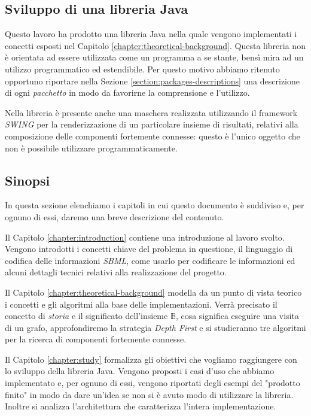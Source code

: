 \subsection{Sviluppo di una libreria Java}
Questo lavoro ha prodotto una libreria Java nella quale vengono
implementati i concetti esposti nel Capitolo
\ref{chapter:theoretical-background}. Questa libreria non \`e
orientata ad essere utilizzata come un programma a se stante, bens\`i
mira ad un utilizzo programmatico ed estendibile. Per questo motivo
abbiamo ritenuto opportuno riportare nella Sezione
\ref{section:packages-descriptions} una descrizione di ogni
\emph{pacchetto} in modo da favorirne la comprensione e l'utilizzo.

Nella libreria \`e presente anche una maschera realizzata utilizzando
il framework \emph{SWING} per la renderizzazione di un particolare
insieme di risultati, relativi alla composizione delle componenti
fortemente connesse: questo \`e l'unico oggetto che non \`e possibile
utilizzare programmaticamente.

\subsection{Sinopsi}
In questa sezione elenchiamo i capitoli in cui questo documento \`e
suddiviso e, per ognuno di essi, daremo una breve descrizione del
contenuto.

Il Capitolo \ref{chapter:introduction} contiene una introduzione al
lavoro svolto. Vengono introdotti i concetti chiave del problema in
questione, il linguaggio di codifica delle informazioni \emph{SBML},
come usarlo per codificare le informazioni ed alcuni dettagli tecnici
relativi alla realizzazione del progetto.

Il Capitolo \ref{chapter:theoretical-background} modella da un punto
di vista teorico i concetti e gli algoritmi alla base delle
implementazioni. Verr\`a precisato il concetto di \emph{storia} e il
significato dell'insieme $\mathbb{B}$, cosa significa eseguire una
visita di un grafo, approfondiremo la strategia \emph{Depth First} e
si studieranno tre algoritmi per la ricerca di componenti fortemente
connesse.

Il Capitolo \ref{chapter:study} formalizza gli obiettivi che vogliamo
raggiungere con lo sviluppo della libreria Java. Vengono proposti i
casi d'uso che abbiamo implementato e, per ognuno di essi, vengono
riportati degli esempi del "prodotto finito" in modo da dare un'idea
se non si \`e avuto modo di utilizzare la libreria. Inoltre si
analizza l'architettura che caratterizza l'intera implementazione.

